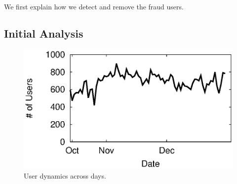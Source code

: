 We first explain how we detect and remove the
fraud users. 




\subsection{Initial Analysis}
\begin{figure}[t]
\begin{minipage}{0.32\textwidth}
 \centering
	\includegraphics[width=1\textwidth]{plots/basic/dynamic_by_day.eps}
	\caption{User dynamics across days.}
	\label{fig:user_dynamic_day}
\end{minipage}
\end{figure}

